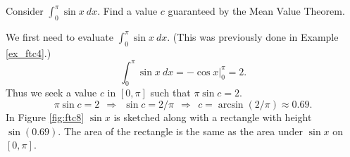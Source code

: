 
\begin{example}  %
Consider $\int_0^\pi \sin x\ dx$. Find a value $c$ guaranteed by the Mean Value Theorem.

\solution We first need to evaluate $\int_0^\pi \sin x\ dx$. (This was previously done in Example \ref{ex_ftc4}.)
\[ \int_0^\pi\sin x\ dx =	-\cos x \Big|_0^\pi = 2. \]
Thus we seek a value $c$ in $[0,\pi]$ such that $\pi\sin c =2$. 
\[ \pi\sin c = 2\ \ \Rightarrow\ \ \sin c = 2/\pi\ \ \Rightarrow\ \ c = \arcsin(2/\pi) \approx 0.69. \]
In Figure \ref{fig:ftc8} $\sin x$ is sketched along with a rectangle with height $\sin (0.69)$. The area of the rectangle is the same as the area under $\sin x$ on $[0,\pi]$.
\end{example}